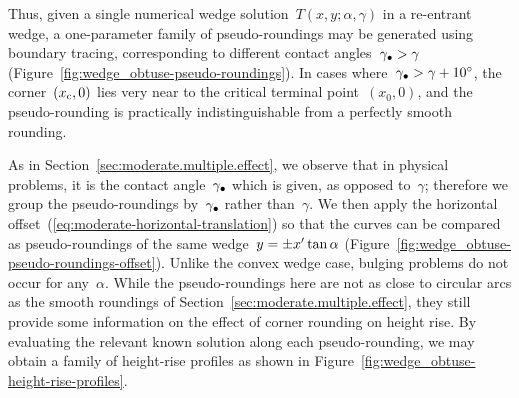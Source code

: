 Thus, given a single numerical wedge solution~$T (x, y; \alpha, \gamma)$
in a re-entrant wedge,
a one-parameter family of pseudo-roundings may be generated
using boundary tracing,
corresponding to different contact angles~$\gamma_\bullet > \gamma$
(Figure~\ref{fig:wedge_obtuse-pseudo-roundings}).
In cases where~$\gamma_\bullet > \gamma + \SI{10}{\degree}$,
the corner~$(x_{\mathrm{c}}, 0)$ lies very near
to the critical terminal point~$(x_0, 0)$,
and the pseudo-rounding is practically indistinguishable
from a perfectly smooth rounding.

\begin{figure}
\end{figure}

As in Section~\ref{sec:moderate.multiple.effect},
we observe that in physical problems,
it is the contact angle~$\gamma_\bullet$ which is given,
as opposed to~$\gamma$;
therefore we group the pseudo-roundings by~$\gamma_\bullet$
rather than~$\gamma$.
We then apply the horizontal offset~(\ref{eq:moderate-horizontal-translation})
so that the curves can be compared as pseudo-roundings
of the same wedge~$y = \pm x' \tan\alpha$
(Figure~\ref{fig:wedge_obtuse-pseudo-roundings-offset}).
Unlike the convex wedge case,
bulging problems do not occur for any~$\alpha$.
While the pseudo-roundings here are not as close to circular arcs
as the smooth roundings of Section~\ref{sec:moderate.multiple.effect},
they still provide some information
on the effect of corner rounding on height rise.
By evaluating the relevant known solution
along each pseudo-rounding,
we may obtain a family of height-rise profiles
as shown in Figure~\ref{fig:wedge_obtuse-height-rise-profiles}.

\begin{figure}
\end{figure}

